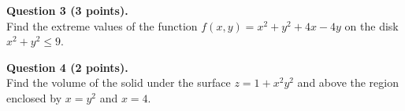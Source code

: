 \documentclass[11pt]{article}
\begin{document}
\noindent \textbf{Question 3 (3 points).} \\
Find the extreme values of the function $f(x,y)=x^2+y^2+4x-4y$ on the disk $x^2+y^2\leq 9$.

\vspace{0.5cm}

\noindent \textbf{Question 4 (2 points).} \\
Find the volume of the solid under the surface $z=1+x^2y^2$ and above the region enclosed by $x=y^2$ and $x=4$.
\end{document}
